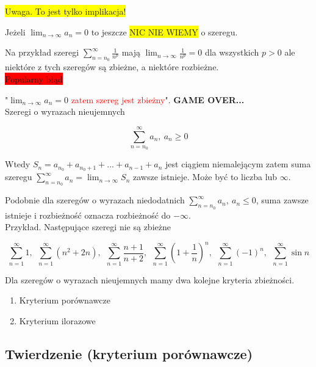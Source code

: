 \colorbox{yellow}{Uwaga. To jest tylko implikacja!}

Jeżeli $ \lim_{n \to \infty} a_n = 0 $ to jeszcze \colorbox{yellow}{NIC NIE WIEMY} o szeregu.

Na przykład szeregi $ \sum\limits_{n = n_0}^{\infty} \frac{1}{n^p} $ mają $ \lim_{n \to \infty} \frac{1}{n^p} = 0 $
dla wszystkich $ p > 0 $ ale niektóre z tych szeregów są zbieżne, a niektóre rozbieżne. \\

\colorbox{red}{Popularny błąd}

"$\lim_{n \to \infty} a_n = 0 $ \textcolor{red}{zatem szereg jest zbieżny}". \textbf{GAME OVER...} \\

Szeregi o wyrazach nieujemnych

$$ \sum\limits_{n = n_0}^{\infty} a_n, \ a_n \geq 0 $$

Wtedy $ S_n = a_{n_0} + a_{n_0 + 1} + ... + a_{n - 1} + a_n $ jest ciągiem niemalejącym zatem suma szeregu
$ \sum\limits_{n = n_0}^{\infty} a_n = \lim_{n \to \infty} S_n $ zawsze istnieje. Może być to liczba lub $\infty$.

Podobnie dla szeregów o wyrazach niedodatnich $ \sum\limits_{n = n_0}^{\infty} a_n, \ a_n \leq 0 $, suma zawsze istnieje
i rozbieżność oznacza rozbieżność do $-\infty$. \\

Przykład. Następujące szeregi nie są zbieżne

$$ \sum\limits_{n = 1}^{\infty} 1, \ \ \sum\limits_{n = 1}^{\infty} (n^2 + 2n), \ \
\sum\limits_{n = 1}^{\infty} \frac{n+1}{n+2}, \ \ \sum\limits_{n = 1}^{\infty} \left(1 + \frac{1}{n} \right)^n , \ \ 
\sum\limits_{n = 1}^{\infty} (-1)^n , \ \ \sum\limits_{n = 1}^{\infty} \sin n$$

Dla szeregów o wyrazach nieujemnych mamy dwa kolejne kryteria zbieżności.

\begin{enumerate}
    \item Kryterium porównawcze
    \item Kryterium ilorazowe \\
\end{enumerate} 

\subsection*{Twierdzenie (kryterium porównawcze)}

